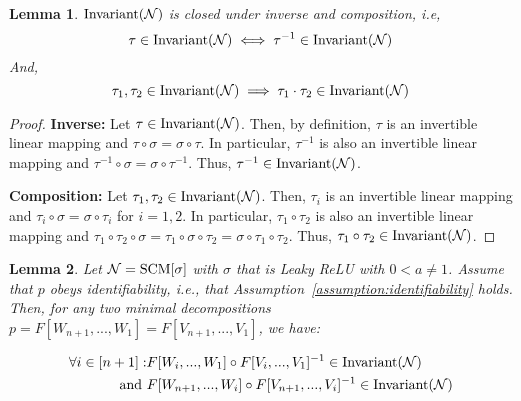 \documentclass{article} %
\newtheorem{lem}{Lemma}
\newcommand{\Inv}{\textnormal{Invariant}}
\begin{document}
\begin{lem}\label{lem:closed} 
$\Inv(\mathcal{N})$ is closed under inverse and composition, i.e, 
\begin{equation}
\tau \in \Inv(\mathcal{N}) \iff \tau^{-1} \in \Inv(\mathcal{N})
\end{equation}
And, 
\begin{equation}
\tau_1,\tau_2 \in \Inv(\mathcal{N}) \implies \tau_1\cdot \tau_2 \in \Inv(\mathcal{N})
\end{equation}
\end{lem}


\begin{proof} 
\textbf{Inverse:} Let $\tau \in \Inv(\mathcal{N})$. Then, by definition, $\tau$ is an invertible linear mapping and $\tau \circ \sigma = \sigma \circ \tau$. In particular, $\tau^{-1}$ is also an invertible linear mapping and $\tau^{-1} \circ \sigma = \sigma \circ \tau^{-1}$. Thus, $\tau^{-1}\in \Inv(\mathcal{N})$. 

\textbf{Composition:} Let $\tau_1,\tau_2 \in \Inv(\mathcal{N})$. Then, $\tau_i$ is an invertible linear mapping and $\tau_i \circ \sigma = \sigma \circ \tau_i$ for $i=1,2$. In particular, $\tau_1 \circ \tau_2$ is also an invertible linear mapping and $\tau_1 \circ \tau_2 \circ \sigma = \tau_1  \circ \sigma \circ \tau_2 =   \sigma \circ \tau_1 \circ \tau_2$. Thus, $\tau_1 \circ \tau_2 \in \Inv(\mathcal{N})$.
\end{proof}

 

\begin{lem}\label{lem:subseq} Let $\mathcal{N} = \textnormal{SCM}[\sigma]$ with $\sigma$ that is Leaky ReLU with $0<a \neq 1$. Assume that $p$ obeys identifiability, i.e., that   Assumption~\ref{assumption:identifiability} holds. Then, for any two minimal decompositions $p = F[W_{n+1},...,W_1] = F[V_{n+1},...,V_1]$, we have:

\begin{equation}
\begin{aligned}
\forall i \in [n+1]: &F[W_{i},...,W_1] \circ F[V_{i},...,V_1]^{-1} \in \Inv(\mathcal{N}) \\
\textnormal{ and } 
&F[W_{n+1},...,W_i] \circ F[V_{n+1},...,V_i]^{-1} \in \Inv(\mathcal{N})
\end{aligned}
\end{equation}
\end{lem}

 
\end{document}
